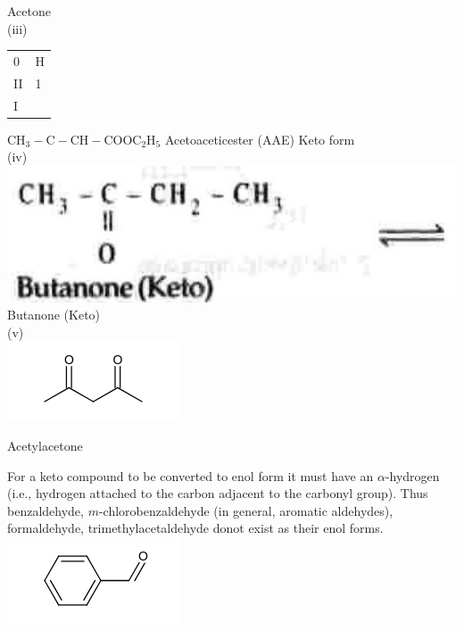 \documentclass[10pt]{article}
\begin{document}
Acetone\\
(iii)

\begin{center}
\begin{tabular}{ll}
0 & H \\
II & 1 \\
I &  \\
\end{tabular}
\end{center}

$\mathrm{CH}_{3}-\mathrm{C}-\mathrm{CH}-\mathrm{COOC}_{2} \mathrm{H}_{5}$ Acetoaceticester (AAE) Keto form\\
(iv)\\
\includegraphics[max width=\textwidth]{2025_01_28_8470952b98110cec3aabg-042} Butanone (Keto)\\
(v)\\
\includegraphics{smile-0ea08ac0d5319effdbb3d56de746a7ed2961a71d}

Acetylacetone

For a keto compound to be converted to enol form it must have an $\alpha$-hydrogen (i.e., hydrogen attached to the carbon adjacent to the carbonyl group). Thus benzaldehyde, $m$-chlorobenzaldehyde (in general, aromatic aldehydes), formaldehyde, trimethylacetaldehyde donot exist as their enol forms.\\
\includegraphics{smile-33f8146d1f073539761f95a4557c4bb84c125568}
\end{document}
